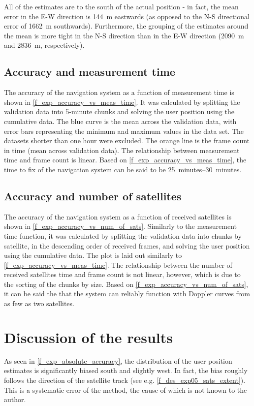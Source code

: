 All of the estimates are to the south of the actual position - in fact, the mean error in the E-W direction is \qty{144}{m} eastwards (as opposed to the N-S directional error of \qty{1662}{m} southwards). Furthermore, the grouping of the estimates around the mean is more tight in the N-S direction than in the E-W direction (\qty{2090}{m} and \qty{2836}{m}, respectively).

\subsection{Accuracy and measurement time}
The accuracy of the navigation system as a function of measurement time is shown in \autoref{f_exp_accuracy_vs_meas_time}. It was calculated by splitting the validation data into 5-minute chunks and solving the user position using the cumulative data. The blue curve is the mean across the validation data, with error bars representing the minimum and maximum values in the data set. The datasets shorter than one hour were excluded. The orange line is the frame count in time (mean across validation data). The relationship between measurement time and frame count is linear. Based on \autoref{f_exp_accuracy_vs_meas_time}, the time to fix of the navigation system can be said to be \qtyrange{25}{30}{minutes}.

\subsection{Accuracy and number of satellites}
The accuracy of the navigation system as a function of received satellites is shown in \autoref{f_exp_accuracy_vs_num_of_sats}. Similarly to the measurement time function, it was calculated by splitting the validation data into chunks by satellite, in the descending order of received frames, and solving the user position using the cumulative data. The plot is laid out similarly to  \autoref{f_exp_accuracy_vs_meas_time}. The relationship between the number of received satellites time and frame count is not linear, however, which is due to the sorting of the chunks by size. Based on \autoref{f_exp_accuracy_vs_num_of_sats}, it can be said the that the system can reliably function with Doppler curves from as few as two satellites.



\section{Discussion of the results}
As seen in \autoref{f_exp_absolute_accuracy}, the distribution of the user position estimates is significantly biased south and slightly west. In fact, the bias roughly follows the direction of the satellite track (see e.g. \autoref{f_des_exp05_sats_extent}). This is a systematic error of the method, the cause of which is not known to the author. 

